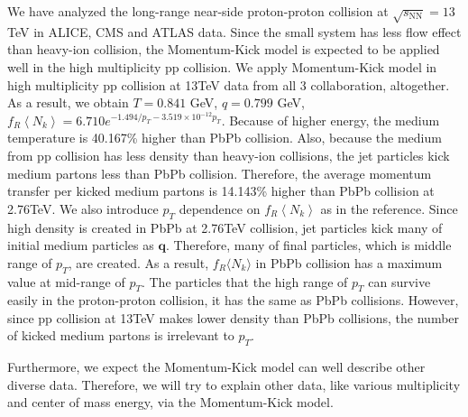 \documentclass[jkps,fleqn,showpacs,showkeys]{revtex4}
\begin{document}
We have analyzed the long-range near-side proton-proton collision at $\sqrt{s_\text{NN}}=13$TeV in ALICE, CMS and ATLAS data. 
Since the small system has less flow effect than heavy-ion collision, the Momentum-Kick model is expected to be applied well in the high multiplicity pp collision.
We apply Momentum-Kick model in high multiplicity pp collision at 13TeV data from all 3 collaboration, altogether. 
As a result, we obtain $T=0.841$ GeV, $q=0.799$ GeV, $f_R\left\langle N_k\right\rangle = 6.710e^{-1.494/p_T-3.519\times10^{-12}p_T}$.
Because of higher energy, the medium temperature is 40.167\% higher than PbPb collision.
Also, because the medium from pp collision has less density than heavy-ion collisions, the jet particles kick medium partons less than PbPb collision.
Therefore, the average momentum transfer per kicked medium partons is 14.143\% higher than PbPb collision at 2.76TeV.
We also introduce $p_T$ dependence on $f_R\left\langle N_k\right\rangle$ as in the reference\cite{PbPb}.
Since high density is created in PbPb at 2.76TeV collision, jet particles kick many of initial medium particles as $\textbf{q}$.
Therefore, many of final particles, which is middle range of $p_T$, are created.
As a result, $f_R \langle N_k \rangle$ in PbPb collision has a maximum value at mid-range of $p_T$.
The particles that the high range of $p_T$ can survive easily in the proton-proton collision, it has the same as PbPb collisions.
However, since pp collision at 13TeV makes lower density than PbPb collisions, the number of kicked medium partons is irrelevant to $p_T$.

Furthermore, we expect the Momentum-Kick model can well describe other diverse data.
Therefore, we will try to explain other data, like various multiplicity and center of mass energy, via the Momentum-Kick model.

\end{document}
